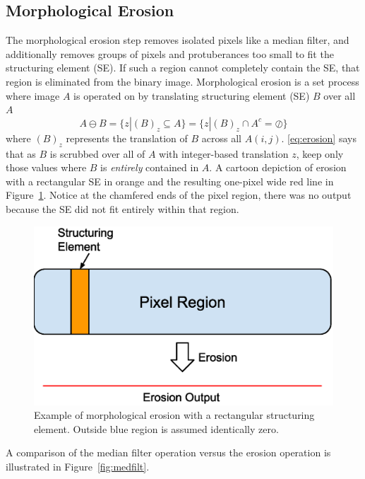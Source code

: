 \subsection{Morphological Erosion}\label{sec:erode}
The morphological erosion step removes isolated pixels like a median filter, and additionally removes groups of pixels and protuberances too small to fit the structuring element (SE).
If such a region cannot completely contain the SE, that region is eliminated from the binary image. 
Morphological erosion is a set process where image $A$ is operated on by translating structuring element (SE) $B$ over all $A$ 
\begin{equation}\label{eq:erosion}
A \ominus B = \lbrace z|(B)_z \subseteq A \rbrace = \lbrace z | (B)_z \cap A^c = \oslash \rbrace
\end{equation}
where $(B)_z$ represents the translation of $B$ across all $A(i,j)$.
\eqref{eq:erosion} says that as $B$ is scrubbed over all of $A$ with integer-based translation $z$, keep only those values where $B$ is \textit{entirely} contained in $A$.
A cartoon depiction of erosion with a rectangular SE in orange and the resulting one-pixel wide red line in Figure~\ref{fig:erode}.
Notice at the chamfered ends of the pixel region, there was no output because the SE did not fit entirely within that region.
\begin{figure}\centering
	\includegraphics[width=0.8\linewidth]{gfx/erode}
	\caption{Example of morphological erosion with a rectangular structuring element. 
		Outside blue region is assumed identically zero.}
	\label{fig:erode}
\end{figure}
A comparison of the median filter operation versus the erosion operation is illustrated in Figure~\ref{fig:medfilt}.
